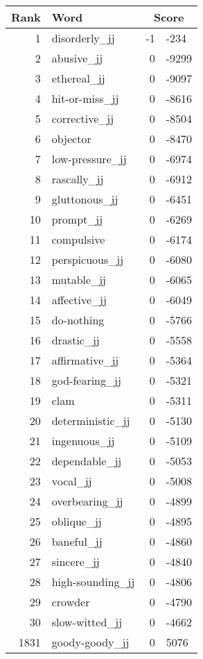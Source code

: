 \begin{longtable}[!htbp]{| rlr@{.}l |}
    \hline
    \textbf{Rank} & \textbf{Word} & \multicolumn{2}{c|}{\textbf{Score}} \\
    \hline
    \endhead
    1 & disorderly\_jj & -1 & -234 \\
    2 & abusive\_jj & 0 & -9299 \\
    3 & ethereal\_jj & 0 & -9097 \\
    4 & hit-or-miss\_jj & 0 & -8616 \\
    5 & corrective\_jj & 0 & -8504 \\
    6 & objector & 0 & -8470 \\
    7 & low-pressure\_jj & 0 & -6974 \\
    8 & rascally\_jj & 0 & -6912 \\
    9 & gluttonous\_jj & 0 & -6451 \\
    10 & prompt\_jj & 0 & -6269 \\
    11 & compulsive & 0 & -6174 \\
    12 & perspicuous\_jj & 0 & -6080 \\
    13 & mutable\_jj & 0 & -6065 \\
    14 & affective\_jj & 0 & -6049 \\
    15 & do-nothing & 0 & -5766 \\
    16 & drastic\_jj & 0 & -5558 \\
    17 & affirmative\_jj & 0 & -5364 \\
    18 & god-fearing\_jj & 0 & -5321 \\
    19 & clam & 0 & -5311 \\
    20 & deterministic\_jj & 0 & -5130 \\
    21 & ingenuous\_jj & 0 & -5109 \\
    22 & dependable\_jj & 0 & -5053 \\
    23 & vocal\_jj & 0 & -5008 \\
    24 & overbearing\_jj & 0 & -4899 \\
    25 & oblique\_jj & 0 & -4895 \\
    26 & baneful\_jj & 0 & -4860 \\
    27 & sincere\_jj & 0 & -4840 \\
    28 & high-sounding\_jj & 0 & -4806 \\
    29 & crowder & 0 & -4790 \\
    30 & slow-witted\_jj & 0 & -4662 \\
    1831 & goody-goody\_jj & 0 & 5076 \\

\end{longtable}
